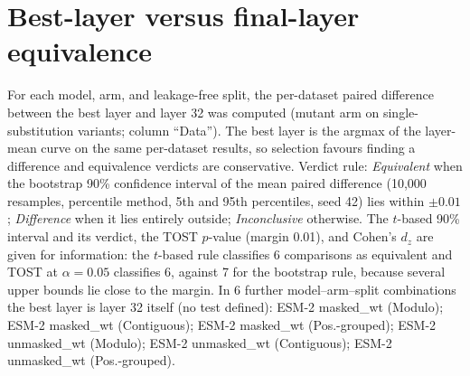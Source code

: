 \documentclass[11pt,a4paper]{article}
\begin{document}
\section*{Best-layer versus final-layer equivalence}
For each model, arm, and leakage-free split, the per-dataset paired difference between
the best layer and layer 32 was computed (mutant arm on single-substitution variants;
column ``Data''). The best layer is the argmax of the layer-mean curve on the same
per-dataset results, so selection favours finding a difference and equivalence verdicts
are conservative. Verdict rule: \emph{Equivalent} when the bootstrap 90\% confidence
interval of the mean paired difference (10,000 resamples, percentile method, 5th and 95th
percentiles, seed 42) lies within $\pm 0.01$; \emph{Difference} when it lies entirely
outside; \emph{Inconclusive} otherwise. The $t$-based 90\% interval and its verdict, the
TOST $p$-value (margin 0.01), and Cohen's $d_z$ are given for information: the $t$-based
rule classifies 6 comparisons as equivalent and TOST at $\alpha = 0.05$ classifies 6,
against 7 for the bootstrap rule, because several upper bounds lie close to the margin.
In 6 further model--arm--split combinations the best layer is layer 32 itself (no test
defined): ESM-2 masked\_wt (Modulo); ESM-2 masked\_wt (Contiguous); ESM-2 masked\_wt (Pos.-grouped); ESM-2 unmasked\_wt (Modulo); ESM-2 unmasked\_wt (Contiguous); ESM-2 unmasked\_wt (Pos.-grouped).
\end{document}

